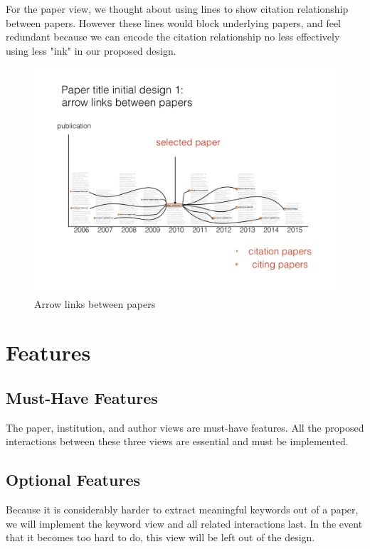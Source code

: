 \documentclass[12pt]{article}
\begin{document}
For the paper view, we thought about using lines to show citation relationship between papers. However these lines would block underlying papers, and feel redundant because we can encode the citation relationship no less effectively using less "ink" in our proposed design.

\begin{figure}[htb!]
    \centering
    \includegraphics[width=160mm]{visproposalDrawing_page_Part_11.pdf}
    \caption{Arrow links between papers}
    \label{fig:zoomable_arrow}
\end{figure}

\section{Features}
\subsection{Must-Have Features}
The paper, institution, and author views are must-have features. All the proposed interactions between these three views are essential and must be implemented.
\subsection{Optional Features}
Because it is considerably harder to extract meaningful keywords out of a paper, we will implement the keyword view and all related interactions last. In the event that it becomes too hard to do, this view will be left out of the design.
\end{document}
